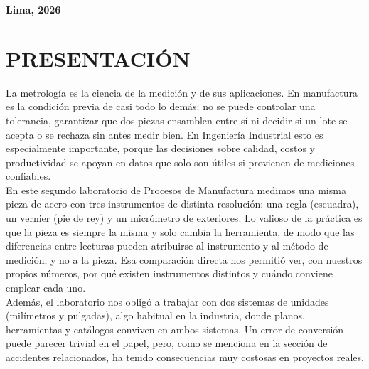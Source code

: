 \documentclass[12pt,a4paper]{article}
\begin{document}
\begin{titlepage}
\begin{center}
		\vspace{1cm}

		\hspace{1.5cm}
	\end{center}

	\vfill
	\begin{center}
		{\sffamily\bfseries\color{darkblue}\large Lima, 2026\par}
	\end{center}
\end{titlepage}
\setcounter{page}{2}

\tableofcontents
\newpage

\section{PRESENTACIÓN}

La metrología es la ciencia de la medición y de sus aplicaciones. En manufactura
es la condición previa de casi todo lo demás: no se puede controlar una
tolerancia, garantizar que dos piezas ensamblen entre sí ni decidir si un lote
se acepta o se rechaza sin antes medir bien. En Ingeniería Industrial esto es
especialmente importante, porque las decisiones sobre calidad, costos y
productividad se apoyan en datos que solo son útiles si provienen de
mediciones confiables.\\[-4pt]

En este segundo laboratorio de Procesos de Manufactura medimos una misma pieza
de acero con tres instrumentos de distinta resolución: una regla (escuadra), un
vernier (pie de rey) y un micrómetro de exteriores. Lo valioso de la práctica es
que la pieza es siempre la misma y solo cambia la herramienta, de modo que las
diferencias entre lecturas pueden atribuirse al instrumento y al método de
medición, y no a la pieza. Esa comparación directa nos permitió ver, con
nuestros propios números, por qué existen instrumentos distintos y cuándo
conviene emplear cada uno.\\[-4pt]

Además, el laboratorio nos obligó a trabajar con dos sistemas de unidades
(milímetros y pulgadas), algo habitual en la industria, donde planos,
herramientas y catálogos conviven en ambos sistemas. Un error de conversión
puede parecer trivial en el papel, pero, como se menciona en la sección de
accidentes relacionados, ha tenido consecuencias muy costosas en proyectos
reales.
\end{document}
